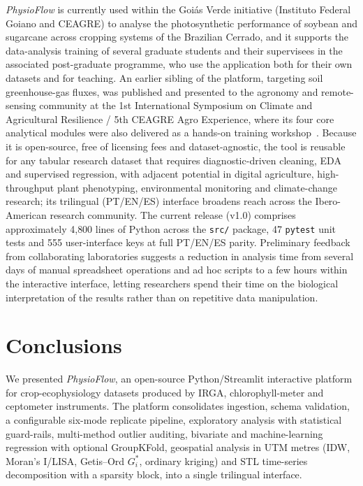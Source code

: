 \documentclass[preprint,12pt,a4paper]{elsarticle}
\begin{document}
\emph{PhysioFlow} is currently used within the Goi\'as Verde initiative (Instituto Federal Goiano and CEAGRE) to analyse the photosynthetic performance of soybean and sugarcane across cropping systems of the Brazilian Cerrado, and it supports the data-analysis training of several graduate students and their supervisees in the associated post-graduate programme, who use the application both for their own datasets and for teaching. An earlier sibling of the platform, targeting soil greenhouse-gas fluxes, was published and presented to the agronomy and remote-sensing community at the 1st International Symposium on Climate and Agricultural Resilience / 5th CEAGRE Agro Experience, where its four core analytical modules were also delivered as a hands-on training workshop~\cite{DaSilva2026Goias}. Because it is open-source, free of licensing fees and dataset-agnostic, the tool is reusable for any tabular research dataset that requires diagnostic-driven cleaning, EDA and supervised regression, with adjacent potential in digital agriculture, high-throughput plant phenotyping, environmental monitoring and climate-change research; its trilingual (PT/EN/ES) interface broadens reach across the Ibero-American research community. The current release (v1.0) comprises approximately 4{,}800 lines of Python across the \texttt{src/} package, 47 \texttt{pytest} unit tests and 555 user-interface keys at full PT/EN/ES parity. Preliminary feedback from collaborating laboratories suggests a reduction in analysis time from several days of manual spreadsheet operations and ad hoc scripts to a few hours within the interactive interface, letting researchers spend their time on the biological interpretation of the results rather than on repetitive data manipulation.

\section{Conclusions}\label{sec:conclusions}

We presented \emph{PhysioFlow}, an open-source Python/Streamlit interactive platform for crop-ecophysiology datasets produced by IRGA, chlorophyll-meter and ceptometer instruments. The platform consolidates ingestion, schema validation, a configurable six-mode replicate pipeline, exploratory analysis with statistical guard-rails, multi-method outlier auditing, bivariate and machine-learning regression with optional GroupKFold, geospatial analysis in UTM metres (IDW, Moran's I/LISA, Getis--Ord $G_i^*$, ordinary kriging) and STL time-series decomposition with a sparsity block, into a single trilingual interface.
\end{document}
